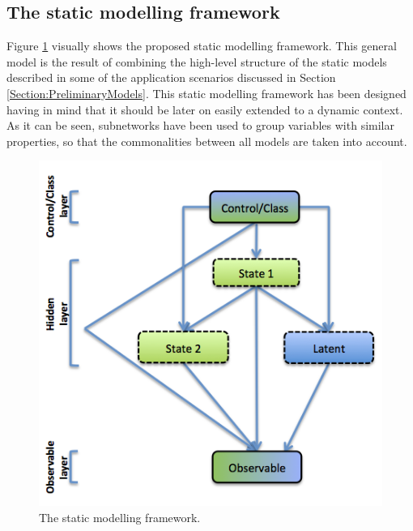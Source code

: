 
\subsection{The static modelling framework}\label{StaticFramework}

Figure \ref{Figure:StaticModellingFramework} visually shows the proposed static modelling framework. This general model is the result of combining the high-level structure of the static models described in some of the application scenarios discussed in Section \ref{Section:PreliminaryModels}. This static modelling framework has been designed having in mind that it should be later on easily extended to a dynamic context. As it can be seen, subnetworks have been used to group variables with similar properties, so that the commonalities between all models are taken into account. 

\begin{figure}[ht!]
\begin{center}
\includegraphics[scale=0.4]{./figures/StaticModellingFramework}
\caption{\label{Figure:StaticModellingFramework} The static modelling framework.}
\end{center}
\end{figure}



